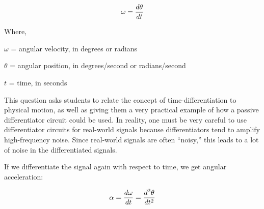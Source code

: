 $$\omega = {d\theta \over dt}$$

\noindent
Where,

$\omega$ = angular velocity, in degrees or radians

$\theta$ = angular position, in degrees/second or radians/second

$t$ = time, in seconds







This question asks students to relate the concept of time-differentiation to physical motion, as well as giving them a very practical example of how a passive differentiator circuit could be used.  In reality, one must be very careful to use differentiator circuits for real-world signals because differentiators tend to amplify high-frequency noise.  Since real-world signals are often ``noisy,'' this leads to a lot of noise in the differentiated signals.

\vskip 10pt

If we differentiate the signal again with respect to time, we get angular acceleration:

$$\alpha = {d\omega \over dt} = {d^2 \theta \over dt^2}$$




